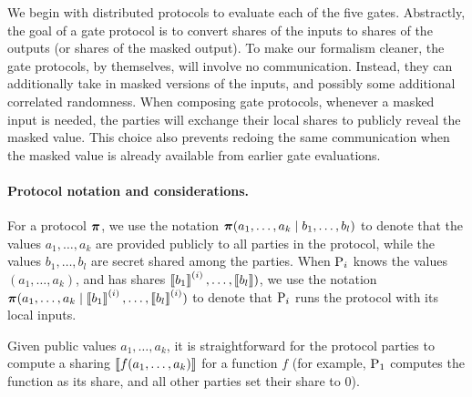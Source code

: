 We begin with distributed protocols to evaluate each of the five gates. Abstractly, the goal of a gate protocol is to convert shares of the inputs to shares of the outputs (or shares of the masked output). To make our formalism cleaner, the gate protocols, by themselves, will involve no communication. Instead, they can additionally take in masked versions of the inputs, and possibly some additional correlated randomness. When composing gate protocols, whenever a masked input is needed, the parties will exchange their local shares to publicly reveal the masked value. This choice also prevents redoing the same communication when the masked value is already available from earlier gate evaluations.


\iffull
\paragraph{Protocol notation and considerations.}
For a protocol $\boldsymbol{\pi}$, we use the notation $\boldsymbol{\pi}(a_1, \dots, a_k \mid b_1, \dots, b_l)$ to denote that the values $a_1, \dots, a_k$ are provided publicly to all parties in the protocol, while the values $b_1, \dots, b_l$ are secret shared among the parties. When $\textnormal{P}_i$ knows the values $(a_1, \dots, a_k)$, and has shares $\left\llbracket b_1 \right\rrbracket^{(i)}, \dots, \left\llbracket b_l \right\rrbracket)$, we use the notation $\boldsymbol{\pi}(a_1, \dots, a_k \mid \left\llbracket b_1 \right\rrbracket^{(i)}, \dots, \left\llbracket b_l \right\rrbracket^{(i)})$ to denote that $\textnormal{P}_i$ runs the protocol with its local inputs. 

Given public values $a_1, \dots, a_k$, it is straightforward for the protocol parties to compute a sharing $\left\llbracket f(a_1, \dots, a_k) \right\rrbracket$ for a function $f$ (for example, $\textnormal{P}_1$ computes the function as its share, and all other parties set their share to $0$).
\else

